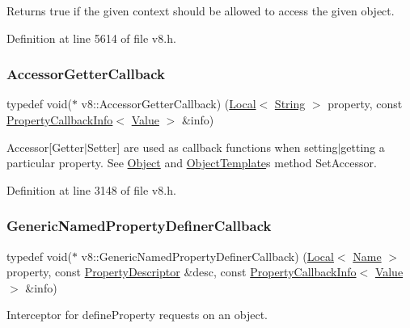 Returns true if the given context should be allowed to access the given object. 

Definition at line 5614 of file v8.\+h.

\mbox{\label{namespacev8_a722613c87061708a4f1aa050d095f868}} 
\subsubsection{\texorpdfstring{Accessor\+Getter\+Callback}{AccessorGetterCallback}}
{\footnotesize\ttfamily typedef void($\ast$ v8\+::\+Accessor\+Getter\+Callback) (\mbox{\hyperlink{classv8_1_1Local}{Local}}$<$ \mbox{\hyperlink{classv8_1_1String}{String}} $>$ property, const \mbox{\hyperlink{classv8_1_1PropertyCallbackInfo}{Property\+Callback\+Info}}$<$ \mbox{\hyperlink{classv8_1_1Value}{Value}} $>$ \&info)}

Accessor\mbox{[}Getter$\vert$\+Setter\mbox{]} are used as callback functions when setting$\vert$getting a particular property. See \mbox{\hyperlink{classv8_1_1Object}{Object}} and \mbox{\hyperlink{classv8_1_1ObjectTemplate}{Object\+Template}}\textquotesingle{}s method Set\+Accessor. 

Definition at line 3148 of file v8.\+h.

\mbox{\label{namespacev8_a66c854bc88d612ab4c65354bc0dc74a0}} 
\subsubsection{\texorpdfstring{Generic\+Named\+Property\+Definer\+Callback}{GenericNamedPropertyDefinerCallback}}
{\footnotesize\ttfamily typedef void($\ast$ v8\+::\+Generic\+Named\+Property\+Definer\+Callback) (\mbox{\hyperlink{classv8_1_1Local}{Local}}$<$ \mbox{\hyperlink{classv8_1_1Name}{Name}} $>$ property, const \mbox{\hyperlink{classv8_1_1PropertyDescriptor}{Property\+Descriptor}} \&desc, const \mbox{\hyperlink{classv8_1_1PropertyCallbackInfo}{Property\+Callback\+Info}}$<$ \mbox{\hyperlink{classv8_1_1Value}{Value}} $>$ \&info)}

Interceptor for define\+Property requests on an object.

